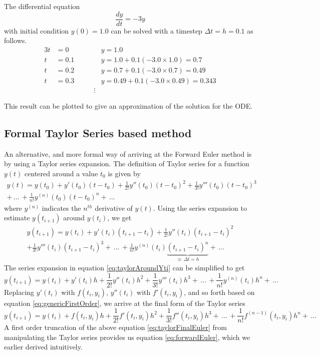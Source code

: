 \begin{example}
 The differential equation
 $$
 \frac{dy}{dt} = -3y
 $$
 with initial condition $y(0) = 1.0$ can be solved with a timestep $\Delta t=h=0.1$ as follows.
 \begin{alignat*}{3}
     t&=0 \qquad &&y=1.0\\
     t&=0.1 \qquad &&y=1.0+0.1(-3.0 \times 1.0) = 0.7\\
     t&=0.2 \qquad &&y=0.7+0.1(-3.0\times 0.7)=0.49\\
     t&=0.3 \qquad &&y=0.49 + 0.1(-3.0\times 0.49) = 0.343\\
     &&\vdots
     \end{alignat*}
     
     This result can be plotted to give an approximation of the solution for the ODE.
\end{example}

\subsection{Formal Taylor Series based method}
An alternative, and more formal way of arriving at the Forward Euler method is by using a Taylor series expansion. The definition of Taylor series for a function $y(t)$ centered around a value $t_0$ is given by
\begin{multline*}
  y(t)=y(t_0) + y'(t_0)(t-t_0) + \frac{1}{2!}y''(t_0)(t-t_0)^2 + \frac{1}{3!}y'''(t_0)(t-t_0)^3 \\ +\, \dots\, + \frac{1}{n!}y^{(n)}(t_0)(t-t_0)^n +\, \dots
\end{multline*}
where $y^{(n)}$ indicates the $n^{th}$ derivative of $y(t)$. Using the series expansion to estimate $y(t_{i+1})$ around $y(t_i)$, we get
\begin{multline}\label{eq:taylorAroundYti}
     y(t_{i+1})=y(t_i) + y'(t_i)(t_{i+1}-t_i) + \frac{1}{2!}y''(t_i)(t_{i+1}-t_i)^2 \\+ \frac{1}{3!}y'''(t_i)(t_{i+1}-t_i)^3  +\, \dots\, + \frac{1}{n!}y^{(n)}(t_i)\underbrace{(t_{i+1}-t_i)^n}_{\equiv\,\Delta t = h} +\, \dots
\end{multline}
The series expansion in equation \ref{eq:taylorAroundYti} can be simplified to get
\begin{equation*}
   y(t_{i+1})=y(t_i) + y'(t_i)h + \frac{1}{2!}y''(t_i)h^2 + \frac{1}{3!}y'''(t_i)h^3 +\, \dots\, + \frac{1}{n!}{y^{(n)}(t_i)}h^n +\, \dots 
\end{equation*}
Replacing $y'(t_i)$ with $f(t_i, y_i)$, $y''(t_i)$ with $f'(t_i, y_i)$, and so forth based on equation \ref{eq:genericFirstOrder}, we arrive at the final form of the Taylor series
\begin{equation}\label{eq:taylorFinalEuler}
     y(t_{i+1})=y(t_i) + f(t_i, y_i)h + \frac{1}{2!}f'(t_i, y_i)h^2 + \frac{1}{3!}f''(t_i, y_i)h^3 +\, \dots\, + \frac{1}{n!}f^{(n-1)}(t_i, y_i)h^n +\, \dots 
\end{equation}
A first order truncation of the above equation \ref{eq:taylorFinalEuler}  from manipulating the Taylor series provides us equation \ref{eq:forwardEuler}, which we earlier derived intuitively.

